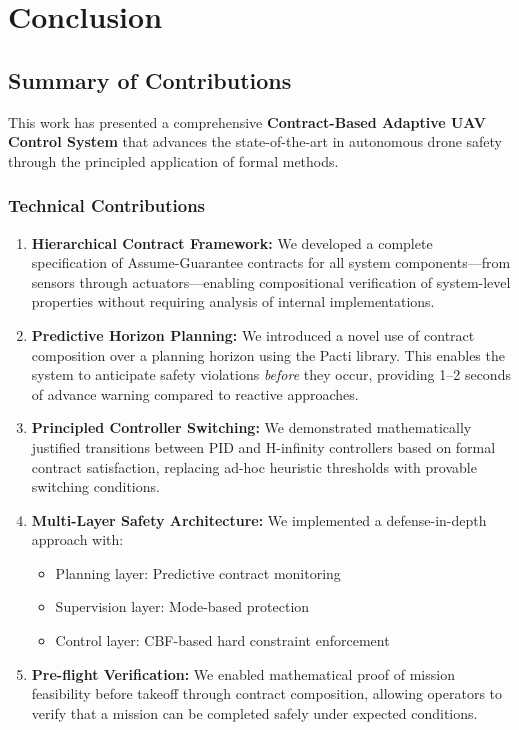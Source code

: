 
\chapter{Conclusion}
\label{ch:conclusion}

\section{Summary of Contributions}

This work has presented a comprehensive \textbf{Contract-Based Adaptive UAV Control System} that advances the state-of-the-art in autonomous drone safety through the principled application of formal methods.

\subsection{Technical Contributions}

\begin{enumerate}[label=\textbf{C\arabic*:}]
    \item \textbf{Hierarchical Contract Framework:} We developed a complete specification of Assume-Guarantee contracts for all system components---from sensors through actuators---enabling compositional verification of system-level properties without requiring analysis of internal implementations.

    \item \textbf{Predictive Horizon Planning:} We introduced a novel use of contract composition over a planning horizon using the Pacti library. This enables the system to anticipate safety violations \textit{before} they occur, providing 1--2 seconds of advance warning compared to reactive approaches.

    \item \textbf{Principled Controller Switching:} We demonstrated mathematically justified transitions between PID and H-infinity controllers based on formal contract satisfaction, replacing ad-hoc heuristic thresholds with provable switching conditions.

    \item \textbf{Multi-Layer Safety Architecture:} We implemented a defense-in-depth approach with:
    \begin{itemize}
        \item Planning layer: Predictive contract monitoring
        \item Supervision layer: Mode-based protection
        \item Control layer: CBF-based hard constraint enforcement
    \end{itemize}

    \item \textbf{Pre-flight Verification:} We enabled mathematical proof of mission feasibility before takeoff through contract composition, allowing operators to verify that a mission can be completed safely under expected conditions.
\end{enumerate}

